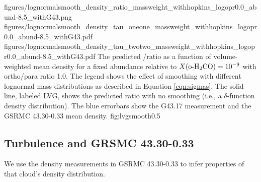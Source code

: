 %
%



\FigureThreePDF
    {figures/lognormalsmooth_density_ratio_massweight_withhopkins_logopr0.0_abund-8.5_withG43.png}
    {figures/lognormalsmooth_density_tau_oneone_massweight_withhopkins_logopr0.0_abund-8.5_withG43.pdf}
    {figures/lognormalsmooth_density_tau_twotwo_massweight_withhopkins_logopr0.0_abund-8.5_withG43.pdf}
{The predicted \formaldehyde \oneone/\twotwo ratio as a function of volume-weighted mean
density for a fixed abundance relative to \hh $X(\textrm{o-H}_2\textrm{CO}) = 10^{-9}$  with \hh
ortho/para ratio 1.0.  The legend shows the effect of smoothing with different
lognormal mass distributions as described in Equation \ref{eqn:sigmas}.  %
The solid line, labeled LVG, shows the predicted ratio
with no smoothing (i.e., a $\delta$-function density distribution).
The blue errorbars show the G43.17 \formaldehyde measurement and the GSRMC
43.30-0.33 mean density.
}
{fig:lvgsmooth}{0.5}

\subsection{Turbulence and GRSMC 43.30-0.33}
\label{sec:grsmcturb}
We use the density measurements in GSRMC 43.30-0.33 to infer properties of that
cloud's density distribution.

